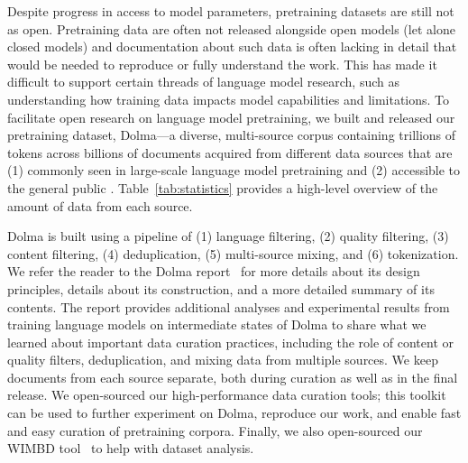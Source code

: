 \documentclass[11pt]{article}
\newcommand{\dolma}{Dolma\xspace}
\newcommand{\note}[4][]{\todo[author=#2,color=#3,fancyline,caption={}]{#4}} %
\newcommand{\kylel}[2][]{\note[#1]{\texttt{kylel}}{brown!40}{#2}}
\newcommand{\hanna}[2][]{\note[#1]{\texttt{Hanna}}{red!40}{#2}}
\newcommand{\dirk}[2][]{\note[#1]{\texttt{Dirk}}{blue!40}{#2}}
\newcommand{\iz}[2][]{\note[#1]{\texttt{Iz}}{teal!40}{#2}}
\begin{document}
Despite progress in access to model parameters, pretraining datasets are still not as open. 
Pretraining data are often not released alongside open models (let alone closed models) and documentation about such data is often lacking in detail that would be needed to reproduce or fully understand the work. 
This has made it difficult to support certain threads of language model research, such as understanding how training data impacts model capabilities and limitations.
To facilitate open research on language model pretraining, we built and released our pretraining dataset, \dolma---a diverse, multi-source corpus containing trillions of tokens across billions of documents acquired from different data sources that are (1) commonly seen in large-scale language model pretraining and (2) accessible to the general public \citep{dolma}. 
Table~\ref{tab:statistics} provides a high-level overview of the amount of data from each source.

\dolma is built using a pipeline of 
(1) language filtering,
(2) quality filtering,
(3) content filtering,
(4) deduplication,
(5) multi-source mixing, and 
(6) tokenization.
We refer the reader to the \dolma report~\citep{dolma} for more details about its design principles, details about its construction, and a more detailed summary of its contents.
The report provides additional analyses and experimental results from training language models on intermediate states of \dolma to share what we learned about important data curation practices, including the role of content or quality filters, deduplication, and mixing data from multiple sources.
We keep documents from each source separate, both during curation as well as in the final release.
We open-sourced our high-performance data curation tools;
this toolkit can be used to further experiment on Dolma, reproduce our work, and enable fast and easy curation of pretraining corpora.
Finally, we also open-sourced our WIMBD tool~\citep{wimbd} to help with dataset analysis. 

\end{document}
